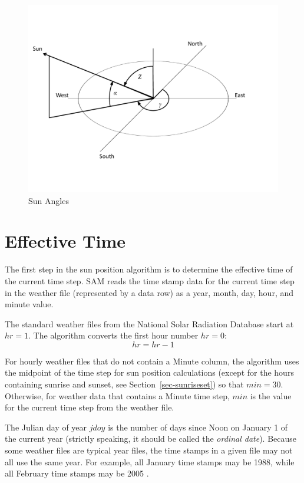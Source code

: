 \documentclass[12pt,letterpaper]{article}
\begin{document}
\begin{figure}
\begin{center}
\includegraphics[scale=0.6]{sun-angles}
\caption{Sun Angles}
\label{fig-sunangles}
\end{center}
\end{figure}

\section{Effective Time}

The first step in the sun position algorithm is to determine the effective time of the current time step. SAM reads the time stamp data for the current time step in the weather file (represented by a data row) as a year, month, day, hour, and minute value. %

The standard weather files from the National Solar Radiation Database \citep{nsrdb} start at $hr=1$. The algorithm converts the first hour number $hr=0$: 
\begin{equation}
hr=hr-1
\end{equation}

For hourly weather files that do not contain a Minute column, the algorithm uses the midpoint of the time step for sun position calculations (except for the hours containing sunrise and sunset, see Section~\ref{sec-sunriseset}) so that $min=30$. Otherwise, for weather data that contains a Minute time step, $min$ is the value for the current time step from the weather file.

The Julian day of year $\mathit{jdoy}$ is the number of days since Noon on January 1 of the current year (strictly speaking, it should be called the \textit{ordinal date}). Because some weather files are typical year files, the time stamps in a given file may not all use the same year. For example, all January time stamps may be 1988, while all February time stamps may be 2005 \citep{tmy3}.
\end{document}
